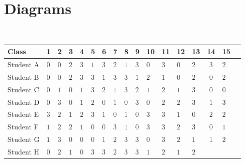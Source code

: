 \documentclass[11pt]{article}
\begin{document}
\section{Diagrams}
\begin{table}
\Huge
\vspace*{-4cm}
\hspace*{-4.5cm}\
\begin{tabular}{|a|p{.7cm}|p{.7cm}|p{.7cm}|p{.7cm}|p{.7cm}|p{.7cm}|p{.7cm}|p{.7cm}|p{.7cm}|p{.7cm}|p{.7cm}|p{.7cm}|p{.7cm}|c|p{.7cm}|p{.7cm}|}
 \hline
Class & 1 & 2 & 3 & 4 & 5 & 6 & 7 & 8
& 9 & 10 & 11 & 12 & 13 & 14 & 15 \\ \hline
\hline
Student A & $0$ & $0$ & $2$ & $3$ & $1$ & $3$
& $2$ & $1$ & $3$ & $0$ & $3$ & $0$ & $2$
& \cellcolor{green!45}$3$ & $2$ \\ \hline
Student B & $0$ & $0$ & $2$ & $3$ & $3$ & $1$
& $3$ & \cellcolor{green!45}$3$ & $1$ & $2$ & $1$ & $0$ & \cellcolor{green!45}$2$
& $0$ & $2$ \\ \hline
Student C & $0$ & $1$ & $0$ & $1$ & $3$ & $2$
& $1$ & \cellcolor{green!45}$3$ & $2$ & $1$ & $2$ & $1$ & \cellcolor{blue!30}$3$
& $0$ & $0$ \\ \hline
Student D & $0$ & $3$ & $0$ & $1$ & $2$ & $0$
& $1$ & $0$ & $3$ & $0$ & $2$ & \cellcolor{green!45}$2$ & $3$
& $1$ & $3$ \\ \hline
Student E & $3$ & $2$ & $1$ & $2$ & $3$ & $1$
& $0$ & $1$ & $0$ & $3$ & \cellcolor{green!45}$3$ & $1$ & $0$
& $2$ & $2$ \\ \hline
Student F & $1$ & $2$ & $2$ & $1$ & $0$ & $0$
& $3$ & $1$ & $0$ & $3$ & \cellcolor{green!45}$3$ & $2$ & \cellcolor{green!45}$3$
& $0$ & $1$ \\ \hline
Student G & $1$ & $3$ & $0$ & $0$ & $0$ & $1$
& \cellcolor{green!45}$2$ & \cellcolor{green!45}$3$ & \cellcolor{green!45}$3$ & $0$ & $3$ & $2$ & $1$
& $1$ & $2$ \\ \hline
Student H & $0$ & $2$ & $1$ & $0$ & $3$ & $3$
& $2$ & \cellcolor{green!45}$3$ & \cellcolor{green!45}$3$ & $1$ & $2$ & $1$ & $2$

\end{tabular}
\end{table}
\end{document}
